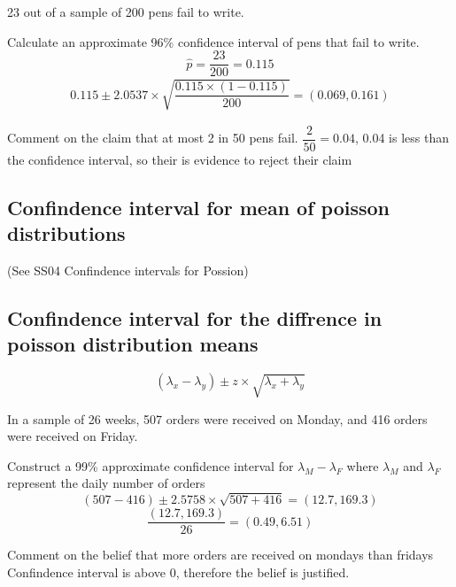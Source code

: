             \begin{example}
            {
                23 out of a sample of 200 pens fail to write.
            }

            \begin{step}{Calculate an approximate 96\% confidence interval of pens that fail to write.}
                $$\hat{p} = \frac{23}{200} = 0.115$$
                \begin{align*}
                    0.115 \pm 2.0537 \times \sqrt{\dfrac{0.115 \times (1-0.115)}{200}} = (0.069, 0.161)
                \end{align*}
            \end{step}

            \begin{step}{Comment on the claim that at most 2 in 50 pens fail.}
                $\dfrac{2}{50} = 0.04$, 0.04 is less than the confidence interval, so their is evidence to reject their claim
            \end{step}

            \end{example}

        \subsection{Confindence interval for mean of poisson distributions}
            (See SS04 Confindence intervals for Possion)

        \subsection{Confindence interval for the diffrence in poisson distribution means}
            $$(\lambda_x - \lambda_y) \pm z \times \sqrt{\lambda_x + \lambda_y}$$

            \begin{example}
            {
                In a sample of 26 weeks, 507 orders were received on Monday, and 416 orders were received on Friday.
            }

            \begin{step}{Construct a 99\% approximate confidence interval for $\lambda_M - \lambda_F$ where $\lambda_M$ and $\lambda_F$ represent the daily number of orders}
                $$(507-416) \pm 2.5758 \times \sqrt{507+416} = (12.7, 169.3)$$
                $$\dfrac{(12.7, 169.3)}{26} = (0.49, 6.51)$$

            \end{step}

            \begin{step}{Comment on the belief that more orders are received on mondays than fridays}
                Confindence interval is above 0, therefore the belief is justified.
            \end{step}

            \end{example}

